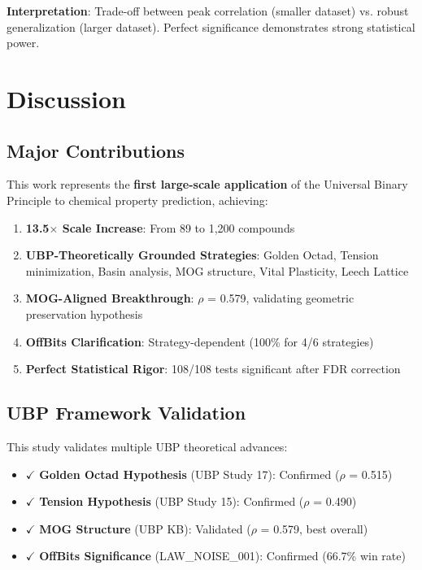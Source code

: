 \documentclass[11pt,letterpaper]{article}
\begin{document}
\textbf{Interpretation}: Trade-off between peak correlation (smaller dataset) vs. robust generalization (larger dataset). Perfect significance demonstrates strong statistical power.

\section{Discussion}

\subsection{Major Contributions}

This work represents the \textbf{first large-scale application} of the Universal Binary Principle to chemical property prediction, achieving:

\begin{enumerate}
    \item \textbf{13.5$\times$ Scale Increase}: From 89 to 1,200 compounds
    \item \textbf{UBP-Theoretically Grounded Strategies}: Golden Octad, Tension minimization, Basin analysis, MOG structure, Vital Plasticity, Leech Lattice
    \item \textbf{MOG-Aligned Breakthrough}: $\rho$ = 0.579, validating geometric preservation hypothesis
    \item \textbf{OffBits Clarification}: Strategy-dependent (100\% for 4/6 strategies)
    \item \textbf{Perfect Statistical Rigor}: 108/108 tests significant after FDR correction
\end{enumerate}

\subsection{UBP Framework Validation}

This study validates multiple UBP theoretical advances:

\begin{itemize}
    \item $\checkmark$ \textbf{Golden Octad Hypothesis} (UBP Study 17): Confirmed ($\rho$ = 0.515)
    \item $\checkmark$ \textbf{Tension Hypothesis} (UBP Study 15): Confirmed ($\rho$ = 0.490)
    \item $\checkmark$ \textbf{MOG Structure} (UBP KB): Validated ($\rho$ = 0.579, best overall)
    \item $\checkmark$ \textbf{OffBits Significance} (LAW\_NOISE\_001): Confirmed (66.7\% win rate)
\end{itemize}
\end{document}
